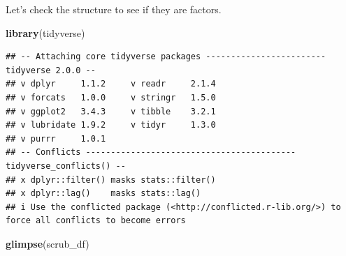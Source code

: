 \documentclass[
  11pt,
]{book}
\newenvironment{Shaded}{\begin{snugshade}}{\end{snugshade}}
\newcommand{\AttributeTok}[1]{\textcolor[rgb]{0.27,0.27,0.27}{#1}}
\newcommand{\DecValTok}[1]{\textcolor[rgb]{0.06,0.06,0.06}{#1}}
\newcommand{\FunctionTok}[1]{\textcolor[rgb]{0.27,0.27,0.27}{\textbf{#1}}}
\newcommand{\NormalTok}[1]{#1}
\newcommand{\OtherTok}[1]{\textcolor[rgb]{0.37,0.37,0.37}{#1}}
\newcommand{\SpecialCharTok}[1]{\textcolor[rgb]{0.43,0.43,0.43}{\textbf{#1}}}
\newcommand{\StringTok}[1]{\textcolor[rgb]{0.5,0.5,0.5}{#1}}
\begin{document}
\begin{Shaded}
\end{Shaded}

Let's check the structure to see if they are factors.

\begin{Shaded}
\begin{Highlighting}[]
\FunctionTok{library}\NormalTok{(tidyverse)}
\end{Highlighting}
\end{Shaded}

\begin{verbatim}
## -- Attaching core tidyverse packages ------------------------ tidyverse 2.0.0 --
## v dplyr     1.1.2     v readr     2.1.4
## v forcats   1.0.0     v stringr   1.5.0
## v ggplot2   3.4.3     v tibble    3.2.1
## v lubridate 1.9.2     v tidyr     1.3.0
## v purrr     1.0.1     
## -- Conflicts ------------------------------------------ tidyverse_conflicts() --
## x dplyr::filter() masks stats::filter()
## x dplyr::lag()    masks stats::lag()
## i Use the conflicted package (<http://conflicted.r-lib.org/>) to force all conflicts to become errors
\end{verbatim}

\begin{Shaded}
\begin{Highlighting}[]
\FunctionTok{glimpse}\NormalTok{(scrub\_df)}
\end{Highlighting}
\end{Shaded}
\end{document}

